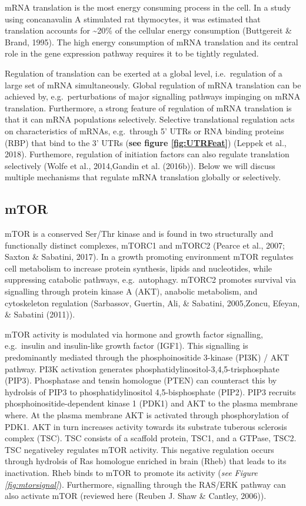 \documentclass[12pt,openany]{book}
\begin{document}
mRNA translation is the most energy consuming process in the cell. In a
study using concanavalin A stimulated rat thymocytes, it was estimated
that translation accounts for \textasciitilde{}20\% of the cellular
energy consumption (Buttgereit \& Brand, 1995). The high energy
consumption of mRNA translation and its central role in the gene
expression pathway requires it to be tightly regulated.

Regulation of translation can be exerted at a global level,
i.e.~regulation of a large set of mRNA simultaneously. Global regulation
of mRNA translation can be achieved by, e.g.~perturbations of major
signalling pathways impinging on mRNA translation. Furthermore, a strong
feature of regulation of mRNA translation is that it can mRNA
populations selectively. Selective translational regulation acts on
characteristics of mRNAs, e.g.~through 5' UTRs or RNA binding proteins
(RBP) that bind to the 3' UTRs (\textbf{see figure \ref{fig:UTRFeat}})
(Leppek et al., 2018). Furthemore, regulation of initiation factors can
also regulate translation selectively (Wolfe et al., 2014,Gandin et al.
(2016b)). Below we will discuss multiple mechanisms that regulate mRNA
translation globally or selectively.

\subsection{mTOR} \label{mTOR}

mTOR is a conserved Ser/Thr kinase and is found in two structurally and
functionally distinct complexes, mTORC1 and mTORC2 (Pearce et al., 2007;
Saxton \& Sabatini, 2017). In a growth promoting environment mTOR
regulates cell metabolism to increase protein synthesis, lipids and
nucleotides, while suppressing catabolic pathways, e.g.~autophagy.
mTORC2 promotes survival via signalling through protein kinase A (AKT),
anabolic metabolism, and cytoskeleton regulation (Sarbassov, Guertin,
Ali, \& Sabatini, 2005,Zoncu, Efeyan, \& Sabatini (2011)).

mTOR activity is modulated via hormone and growth factor signalling,
e.g.~insulin and insulin-like growth factor (IGF1). This signalling is
predominantly mediated through the phosphoinositide 3-kinase (PI3K) /
AKT pathway. PI3K activation generates
phosphatidylinositol-3,4,5-trisphosphate (PIP3). Phosphatase and tensin
homologue (PTEN) can counteract this by hydrolsis of PIP3 to
phosphatidylinositol 4,5-bisphosphate (PIP2). PIP3 recruits
phosphoinositide-dependent kinase 1 (PDK1) and AKT to the plasma
membrane where. At the plasma membrane AKT is activated through
phosphorylation of PDK1. AKT in turn increases activity towards its
substrate tuberous sclerosis complex (TSC). TSC consists of a scaffold
protein, TSC1, and a GTPase, TSC2. TSC negativeley regulates mTOR
activity. This negative regulation occurs through hydrolsis of Ras
homologue enriched in brain (Rheb) that leads to its inactivation. Rheb
binds to mTOR to promote its activity (\emph{see Figure
\ref{fig:mtorsignal}}). Furthermore, signalling through the RAS/ERK
pathway can also activate mTOR (reviewed here (Reuben J. Shaw \&
Cantley, 2006)).
\end{document}
